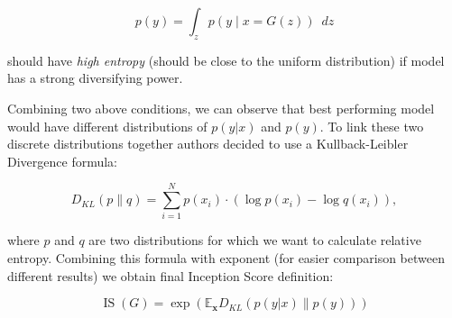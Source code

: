 \documentclass[12pt,a4paper,openany]{book}
\begin{document}
\begin{equation}
p(y) = \int_{z} p(y \mid x=G(z)) \phantom{v} dz
\end{equation}

\noindent should have \textit{high entropy} (should be close to the uniform distribution) if model has a strong diversifying power.\

\noindent Combining two above conditions, we can observe that best performing model would have different distributions of $p(y|x)$ and $p(y)$. To link these two discrete distributions together authors decided to use a Kullback-Leibler Divergence formula:

\begin{equation}
D_{K L}(p \| q)=\sum_{i=1}^{N} p\left(x_{i}\right) \cdot\left(\log p\left(x_{i}\right)-\log q\left(x_{i}\right)\right),
\end{equation}

\noindent where $p$ and $q$ are two distributions for which we want to calculate relative entropy. Combining this formula with exponent (for easier comparison between different results) we obtain final Inception Score definition:

\begin{equation}
\operatorname{IS}(G)=\exp \left(\mathbb{E}_{\mathbf{x}} D_{K L}(p(y|x) \| p(y))\right)
\end{equation}

%
\end{document}
